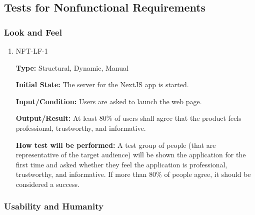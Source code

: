\documentclass[12pt, titlepage]{article}
\begin{document}
\subsection{Tests for Nonfunctional Requirements}

\subsubsection{Look and Feel}

\begin{enumerate}

\item{NFT-LF-1}

\textbf{Type:} Structural, Dynamic, Manual

\textbf{Initial State:} The server for the NextJS app is started.
    
\textbf{Input/Condition:} Users are asked to launch the web page.

\textbf{Output/Result:} At least 80\% of users shall agree that the product feels professional, trustworthy, and informative.

\textbf{How test will be performed:} A test group of people (that are representative of the target audience) will be shown the application for the first time and asked whether they feel the application is professional, trustworthy, and informative. If more than 80\% of people agree, it should be considered a success.
					
					
\end{enumerate}

\subsubsection{Usability and Humanity}
\end{document}
